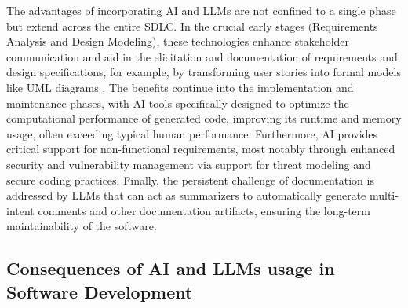 The advantages of incorporating AI and LLMs are not confined to a single phase but extend across the entire SDLC. In the crucial early stages (Requirements Analysis and Design Modeling), these technologies enhance stakeholder communication and aid in the elicitation and documentation of requirements and design specifications, for example, by transforming user stories into formal models like UML diagrams \cite{Hemmat:2025rd}. The benefits continue into the implementation and maintenance phases, with AI tools specifically designed to optimize the computational performance of generated code, improving its runtime and memory usage, often exceeding typical human performance. Furthermore, AI provides critical support for non-functional requirements, most notably through enhanced security and vulnerability management via support for threat modeling and secure coding practices. Finally, the persistent challenge of documentation is addressed by LLMs that can act as summarizers to automatically generate multi-intent comments and other documentation artifacts, ensuring the long-term maintainability of the software.

\subsection{Consequences of AI and LLMs usage in Software Development}

